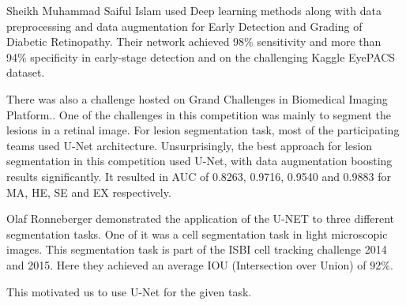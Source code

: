 \documentclass[conference]{IEEEtran}
\begin{document}
\par

Sheikh Muhammad Saiful Islam used Deep learning methods along with data preprocessing and data augmentation for Early Detection and Grading of Diabetic Retinopathy\cite{8}. Their network achieved 98\% sensitivity and more than 94\% specificity in early-stage detection and on the challenging Kaggle EyePACS dataset\cite{9}.
\par

There was also a challenge\cite{idrid} hosted on Grand Challenges in Biomedical Imaging Platform.. One of the challenges in this competition was mainly to segment the lesions in a retinal image. For lesion segmentation task, most of the participating teams used U-Net architecture\cite{unet}. Unsurprisingly, the best approach for lesion segmentation in this competition used U-Net, with data augmentation boosting results significantly. It resulted in AUC of 0.8263, 0.9716, 0.9540 and 0.9883 for MA, HE, SE and EX respectively. 
\par
Olaf Ronneberger demonstrated the application of the U-NET to three different segmentation tasks\cite{unet}. One of it was a cell segmentation task in light microscopic images. This segmentation task is part of the ISBI cell tracking challenge 2014 and 2015\cite{6, 7}. Here they achieved an average IOU (Intersection over Union) of 92\%.
\par
This motivated us to use U-Net for the given task.
\end{document}
